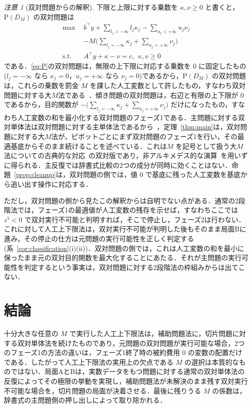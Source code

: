 \documentclass[11pt,a4paper]{ltjsarticle}
\theoremstyle{plain}
\theoremstyle{definition}
\theoremstyle{remark}
\newtheorem{remark}[theorem]{注意}
\newcommand{\Pb}{\mathrm{P}}
\begin{document}
\begin{remark}[双対問題からの解釈]
\label{rem:dual}
下限と上限に対する乗数を $\kappa,\nu\ge0$ と書くと，$\Pb(D_M)$ の双対問題は
\begin{align*}
\max\ \ & b^\top y+\textstyle\sum_{l_j>-\infty}l_j\kappa_j-\sum_{u_j<+\infty}u_j\nu_j\\
&-M\textstyle\bigl(\sum_{l_j=-\infty}\kappa_j+\sum_{u_j=+\infty}\nu_j\bigr)\\
\text{s.t.}\ \ & A^\top y+\kappa-\nu=c,\ \ \kappa,\nu\ge0
\end{align*}
である．\eqref{eq:P}の双対問題は，無限の上下限に対応する乗数を $0$ に固定したもの($l_j=-\infty$ なら $\kappa_j=0$，$u_j=+\infty$ なら $\nu_j=0$)であるから，$\Pb(D_M)$ の双対問題は，これらの乗数を罰金 $M$ を課した人工変数として許したもの，すなわち双対問題に対する大$M$法である~\cite{koberstein2005}．傾き問題の双対問題は，右辺と有限の上下限が $0$ であるから，目的関数が $-\bigl(\sum_{l_j=-\infty}\kappa_j+\sum_{u_j=+\infty}\nu_j\bigr)$ だけになったもの，すなわち人工変数の和を最小化する双対問題のフェーズ1である．主問題に対する双対単体法は双対問題に対する主単体法であるから~\cite{lemke1954}，定理~\ref{thm:main}は，双対問題に対する大$M$法が，ピボットごとにまず双対問題のフェーズ1を行い，その最適基底からそのまま続けることを述べている．これは$M$ を記号として扱う大$M$法についての古典的な対応~\cite{bazaraa2010}の双対版であり，非アルキメデス的な演算~\cite{cococcioni2021}を用いずに得られる．主反復では辞書式比較の2つの成分が同時に効くことはない．命題~\ref{prop:cleanup}は，双対問題の側では，値 $0$ で基底に残った人工変数を基底から追い出す操作に対応する．

ただし，双対問題の側から見たこの解釈からは自明でない点がある．通常の2段階法では，フェーズ1の最適値が人工変数の残存を示せば，すなわちここでは $z^1<0$ で双対実行不可能と判明すれば，そこで停止し，フェーズ2は行わない．これに対して人工上下限法は，双対実行不可能が判明した後もそのまま局面Bに進み，その停止の仕方は元問題の実行可能性を正しく判定する(系~\ref{cor:classification}(i)(ii))．双対問題の側では，これは人工変数の和を最小に保ったまま元の双対目的関数を最大化することにあたる．それが主問題の実行可能性を判定するという事実は，双対問題に対する2段階法の枠組みからは出てこない．
\end{remark}


\section{結論}
\label{sec:conclusion}

十分大きな任意の $M$ で実行した人工上下限法は，補助問題法に，切片問題に対する双対単体法を続けたものであり，元問題の双対問題が実行可能な場合，2つのフェーズ1の方法の違いは，フェーズ1終了時の被約費用 $0$ の変数の配置だけである．したがって人工上下限法の実用上の欠点である $M$ の選択は本質的なものではない．局面AとBは，実数データをもつ問題に対する通常の双対単体法の反復によってその極限の挙動を実現し，補助問題法が未解決のまま残す双対実行不可能な場合を，切片問題の局面が決着させる．最後に残りうる $M$ の係数は，辞書式の主問題側の押し出しによって取り除かれる．
\end{document}
